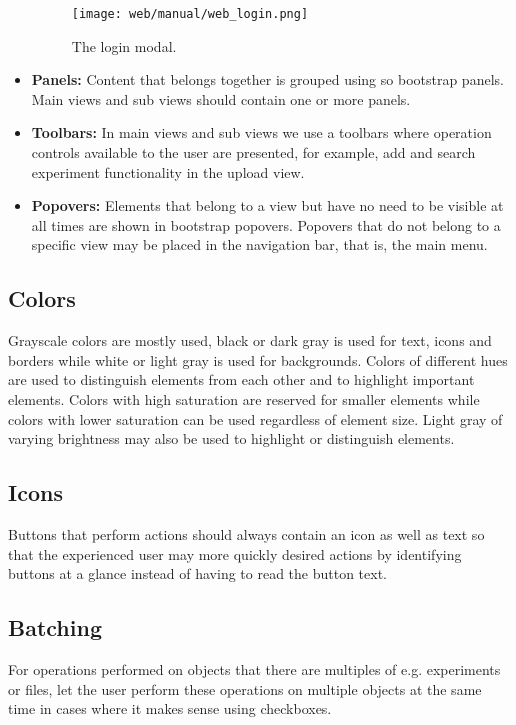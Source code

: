 \begin{itemize}
\begin{figure}
\centering
\texttt{[image: web/manual/web\_login.png]}
\caption{\footnotesize The login modal.}
\label{fig:web_search_login1}
\end{figure}

    \item \textbf{Panels:}
Content that belongs together is grouped using so bootstrap panels. Main views and sub views should contain one or more panels.
    
    \item \textbf{Toolbars:}
In main views and sub views we use a toolbars where operation controls available to the user are presented, for example, add and search experiment functionality in the upload view.
    
    \item \textbf{Popovers:}
Elements that belong to a view but have no need to be visible at all times are shown in bootstrap popovers. Popovers that do not belong to a specific view may be placed in the navigation bar, that is, the main menu.
\end{itemize}

\subsection{Colors}
Grayscale colors are mostly used, black or dark gray is used for text, icons and borders while white or light gray is used for backgrounds. Colors of different hues are used to distinguish elements from each other and to highlight important elements. Colors with high saturation are reserved for smaller elements while colors with lower saturation can be used regardless of element size. Light gray of varying brightness may also be used to highlight or distinguish elements.

\subsection{Icons}
Buttons that perform actions should always contain an icon as well as text so that the experienced user may more quickly desired actions by identifying buttons at a glance instead of having to read the button text. 

\subsection{Batching}
For operations performed on objects that there are multiples of e.g. experiments or files, let the user perform these operations on multiple objects at the same time in cases where it makes sense using checkboxes.


